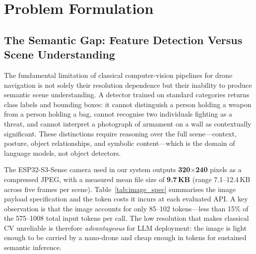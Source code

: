 \documentclass[journal]{IEEEtran}
\begin{document}
\section{Problem Formulation}
\label{sec:problem}

\subsection{The Semantic Gap: Feature Detection Versus Scene Understanding}

The fundamental limitation of classical computer-vision pipelines for drone
navigation is not solely their resolution dependence but their inability to
produce semantic scene understanding.
A detector trained on standard categories returns class labels and bounding
boxes: it cannot distinguish a person holding a weapon from a person holding
a bag, cannot recognise two individuals fighting as a threat, and cannot
interpret a photograph of armament on a wall as contextually significant.
These distinctions require reasoning over the full scene---context, posture,
object relationships, and symbolic content---which is the domain of language
models, not object detectors.

The ESP32-S3-Sense camera used in our system outputs \textbf{320$\times$240}
pixels as a compressed JPEG, with a measured mean file size of
\textbf{9.7\,KB} (range 7.1--12.4\,KB across five frames per scene).
Table~\ref{tab:image_spec} summarises the image payload specification and
the token costs it incurs at each evaluated API.
A key observation is that the image accounts for only 85--102 tokens---less
than 15\% of the 575--1008 total input tokens per call.
The low resolution that makes classical CV unreliable is therefore
\emph{advantageous} for LLM deployment: the image is light enough to be
carried by a nano-drone and cheap enough in tokens for sustained semantic
inference.
\end{document}
